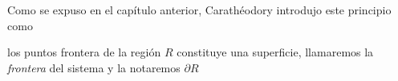 Como se expuso en el capítulo anterior,  Carathéodory introdujo este principio como

los puntos frontera de la región $R$ constituye una superficie, llamaremos la {\it frontera} del sistema y la notaremos $\partial R$